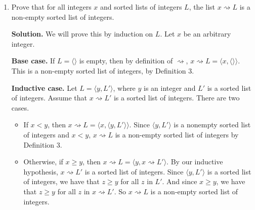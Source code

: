 \documentclass[11pt]{article}
\newcommand{\nil}{\langle\rangle}
\newcommand{\cons}[2]{\langle #1,#2\rangle}
\newcommand{\insertop}{\rightsquigarrow}
\begin{document}
\begin{enumerate}[leftmargin=*]
\begin{itemize}
  \item If $p=q\to r$, then $p\equiv q\uparrow(r\uparrow r)$ by the truth table
  \[
  \begin{array}{c|c|c|c|c}
  q & r & q\to r & r\uparrow r & q\uparrow(r\uparrow r) \\
  \hline
  T & T & T & F & T \\
  T & F & F & T & F \\
  F & T & T & F & T \\
  F & F & T & T & T
  \end{array}
  \]
  This one takes a bit more work, since one needs to arrive at the fact that $p\to q\equiv \neg p\lor q$.
  This can be seen easily via truth table, but takes a bit of reasoning to get to via proof. However, once you view this as a conjunction, it is straightforward to use De Morgan's laws and the previous cases to get to the result.
\end{itemize}

\textbf{Notes.} Observe that this proof really gives a recursive algorithm for rewriting an arbitrary propositional sentence using only $\uparrow$. This is a consequence of the formal inductive argument.

\item Prove that for all integers $x$ and sorted lists of integers $L$, the list $x\insertop L$ is a non-empty sorted list of integers.

\textbf{Solution.} We will prove this by induction on $L$. Let $x$ be an arbitrary integer.

\textbf{Base case.} If $L=\nil$ is empty, then by definition of $\insertop$,
$x\insertop L=\cons{x}{\nil}$. This is a non-empty sorted list of integers, by Definition 3.

\textbf{Inductive case.} Let $L=\cons{y}{L'}$, where $y$ is an integer and $L'$ is a sorted list of integers.
Assume that $x\insertop L'$ is a sorted list of integers. There are two cases.

\begin{itemize}
  \item If $x<y$, then $x\insertop L=\cons{x}{\cons{y}{L'}}$.
  Since $\cons{y}{L'}$ is a nonempty sorted list of integers and $x<y$, $x\insertop L$ is a non-empty sorted list of integers by Definition 3.

  \item Otherwise, if $x\ge y$, then $x\insertop L=\cons{y}{x\insertop L'}$.
  By our inductive hypothesis, $x\insertop L'$ is a sorted list of integers. Since $\cons{y}{L'}$ is a sorted list of integers, we have that $z\ge y$ for all $z$ in $L'$.
  And since $x\ge y$, we have that $z\ge y$ for all $z$ in $x\insertop L'$.
  So $x\insertop L$ is a non-empty sorted list of integers.
\end{itemize}


\end{enumerate}
\end{document}
